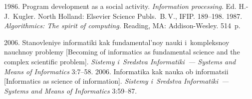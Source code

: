   \begin{multicols}{2}

\renewcommand{\bibname}{\protect\rmfamily References}

{\small\frenchspacing
 {\baselineskip=10.8pt
 \begin{thebibliography}{99} 
 
 1986. Program development as a social activity. \textit{Information processing}. Ed. H.-J.~Kugler. North Holland: Elsevier Science 
Publs.\ B.\,V., IFIP. 189--198.
 1987. \textit{Algorithmics: The spirit of computing}. Reading, MA: Addison-Wesley. 
514~p.

 2006. Stanovleniye informatiki kak fundamental'noy nauki i~kompleksnoy nauchnoy 
problemy [Becoming of informatics as fundamental science and the complex scientific problem]. 
\textit{Sistemy i~Sredstva Informatiki~--- Systems and Means of Informatics}  3:7--58.
 2006. Informatika kak nauka ob informatsii [Informatics as science of 
information]. \textit{Sistemy i~Sredstva Informatiki~--- Systems and Means of Informatics}  3:59--87.


\end{thebibliography}}}
\end{multicols}
